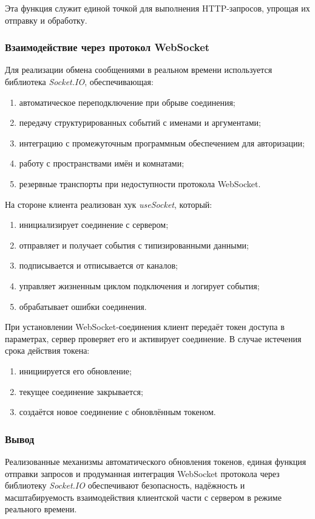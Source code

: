 Эта функция служит единой точкой для выполнения HTTP-запросов, упрощая их отправку и обработку.

\subsubsection{Взаимодействие через протокол WebSocket}
Для реализации обмена сообщениями в реальном времени используется библиотека \textit{Socket.IO}, обеспечивающая:
\begin{enumerate}
  \item автоматическое переподключение при обрыве соединения;
  \item передачу структурированных событий с именами и аргументами;
  \item интеграцию с промежуточным программным обеспечением для авторизации;
  \item работу с пространствами имён и комнатами;
  \item резервные транспорты при недоступности протокола WebSocket.
\end{enumerate}

На стороне клиента реализован хук \textit{useSocket}, который:
\begin{enumerate}
  \item инициализирует соединение с сервером;
  \item отправляет и получает события с типизированными данными;
  \item подписывается и отписывается от каналов;
  \item управляет жизненным циклом подключения и логирует события;
  \item обрабатывает ошибки соединения.
\end{enumerate}

При установлении WebSocket-соединения клиент передаёт токен доступа в параметрах, сервер проверяет его и активирует соединение. В случае истечения срока действия токена:
\begin{enumerate}
  \item инициируется его обновление;
  \item текущее соединение закрывается;
  \item создаётся новое соединение с обновлённым токеном.
\end{enumerate}

\subsubsection*{Вывод}

Реализованные механизмы автоматического обновления токенов, единая функция отправки запросов и продуманная интеграция WebSocket протокола через библиотеку \textit{Socket.IO} обеспечивают безопасность, надёжность и масштабируемость взаимодействия клиентской части с сервером в режиме реального времени.
